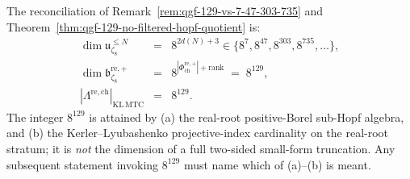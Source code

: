 \begin{remark}
\label{rem:qgf-129-interpretation-sharpened}
The reconciliation of
Remark~\ref{rem:qgf-129-vs-7-47-303-735}
and Theorem~\ref{thm:qgf-129-no-filtered-hopf-quotient} is:
\[
 \begin{array}{lcl}
 \dim\mathfrak u_{\zeta_8}^{\le N} & = & 8^{2d(N)+3}
 \in\{8^7,8^{47},8^{303},8^{735},\ldots\},\\
 \dim\mathfrak b^{\mathrm{re},+}_{\zeta_8} & = &
 8^{|\Phi^{\mathrm{re},+}_{\mathrm{ch}}|+\mathrm{rank}}\;=\;8^{129},\\
 |\Lambda^{\mathrm{re,ch}}|_{\mathrm{KL\,MTC}} & = & 8^{129}.
 \end{array}
\]
The integer \(8^{129}\) is attained by (a) the real-root positive-Borel
sub-Hopf algebra, and (b) the Kerler--Lyubashenko projective-index
cardinality on the real-root stratum; it is \emph{not} the dimension
of a full two-sided small-form truncation. Any subsequent statement
invoking $8^{129}$ must name which of (a)--(b) is meant.
\end{remark}

